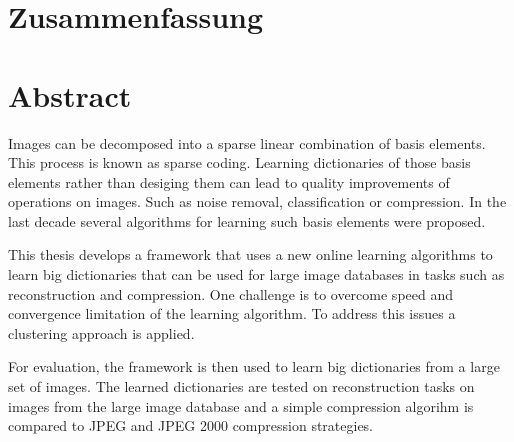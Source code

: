 \newpage
{}
{}
\chapter*{Zusammenfassung}
\thispagestyle{empty}

\newpage
{}
{}
\chapter*{Abstract}
\thispagestyle{empty}

Images can be decomposed into a sparse linear combination of basis
elements. This process is known as sparse coding. Learning dictionaries of
those basis elements rather than desiging them can lead to quality improvements
of operations on images. Such as noise removal, classification or compression.
In the last decade several algorithms for learning such basis elements were
proposed.

This thesis develops a framework that uses a new online learning
algorithms to learn big dictionaries that can be used for large image databases
in tasks such as reconstruction and compression. One challenge is to overcome
speed and convergence limitation of the learning algorithm. To address this
issues a clustering approach is applied. 

For evaluation, the framework is then used to learn big dictionaries from a
large set of images. The learned dictionaries are tested on reconstruction
tasks on images from the large image database and a simple compression algorihm
is compared to JPEG and JPEG 2000 compression strategies.



